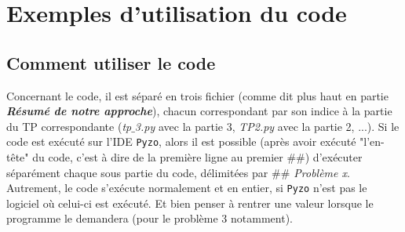 \documentclass{article}      %
\begin{document}
\section{Exemples d'utilisation du code}
\subsection{Comment utiliser le code}
Concernant le code, il est séparé en trois fichier (comme dit plus haut en partie \textbf{\textit{Résumé de notre approche}}), chacun correspondant par son indice à la partie du TP correspondante (\textsl{tp$\_$3.py} avec la partie 3, \textsl{TP2.py} avec la partie 2, ...).
Si le code est exécuté sur l'IDE \texttt{Pyzo}, alors il est possible (après avoir exécuté "l'en-tête" du code, c'est à dire de la première ligne  au premier $\#\#$) d'exécuter séparément chaque sous partie du code, délimitées par \textit{$\#\#$ Problème x}.\\
Autrement, le code s'exécute normalement et en entier, si \texttt{Pyzo} n'est pas le logiciel où celui-ci est exécuté. Et bien penser à rentrer une valeur lorsque le programme le demandera (pour le problème 3 notamment).
\end{document}
